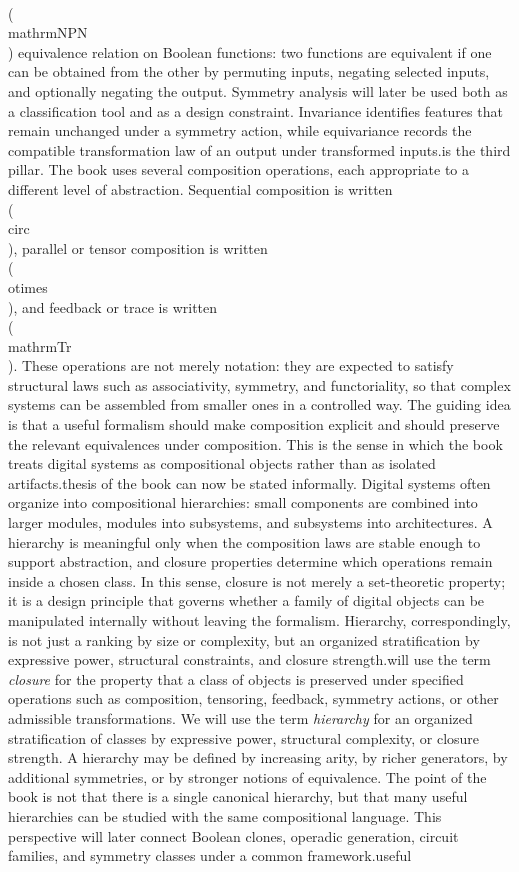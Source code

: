 \\(\\mathrm{NPN}\\) equivalence relation on Boolean functions: two functions are equivalent if one can be obtained from the other by permuting inputs, negating selected inputs, and optionally negating the output. Symmetry analysis will later be used both as a classification tool and as a design constraint. Invariance identifies features that remain unchanged under a symmetry action, while equivariance records the compatible transformation law of an output under transformed inputs.\n\nComposition is the third pillar. The book uses several composition operations, each appropriate to a different level of abstraction. Sequential composition is written \\(\\circ\\), parallel or tensor composition is written \\(\\otimes\\), and feedback or trace is written \\(\\mathrm{Tr}\\). These operations are not merely notation: they are expected to satisfy structural laws such as associativity, symmetry, and functoriality, so that complex systems can be assembled from smaller ones in a controlled way. The guiding idea is that a useful formalism should make composition explicit and should preserve the relevant equivalences under composition. This is the sense in which the book treats digital systems as compositional objects rather than as isolated artifacts.\n\nThe thesis of the book can now be stated informally. Digital systems often organize into compositional hierarchies: small components are combined into larger modules, modules into subsystems, and subsystems into architectures. A hierarchy is meaningful only when the composition laws are stable enough to support abstraction, and closure properties determine which operations remain inside a chosen class. In this sense, closure is not merely a set-theoretic property; it is a design principle that governs whether a family of digital objects can be manipulated internally without leaving the formalism. Hierarchy, correspondingly, is not just a ranking by size or complexity, but an organized stratification by expressive power, structural constraints, and closure strength.\n\nWe will use the term \emph{closure} for the property that a class of objects is preserved under specified operations such as composition, tensoring, feedback, symmetry actions, or other admissible transformations. We will use the term \emph{hierarchy} for an organized stratification of classes by expressive power, structural complexity, or closure strength. A hierarchy may be defined by increasing arity, by richer generators, by additional symmetries, or by stronger notions of equivalence. The point of the book is not that there is a single canonical hierarchy, but that many useful hierarchies can be studied with the same compositional language. This perspective will later connect Boolean clones, operadic generation, circuit families, and symmetry classes under a common framework.\n\nA useful 